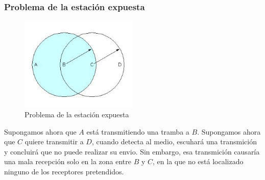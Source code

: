 \subsubsection{Problema de la estación expuesta}
\begin{figure}[H]
	\centering
	\includegraphics[width=0.5\textwidth
]{images/estacion-descubierta.jpg}
	\caption[Problema de la estación expuesta]{Problema de la estación expuesta}
	\label{fig:estacion-expuesta}
\end{figure}

Supongamos ahora que \(A\) está transmitiendo una tramba a \(B\). Supongamos ahora que \(C\) quiere transmitir a \(D\), cuando detecta al medio, escuhará una transmición y concluirá que no puede realizar su envio. Sin embargo, esa transmición causaría una mala recepción solo en la zona entre \(B\) y \(C\), en la que no está localizado ninguno de los receptores pretendidos.
